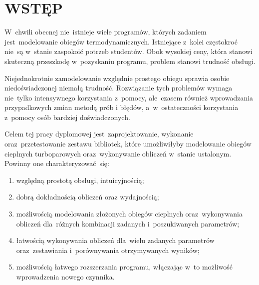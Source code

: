 \section{WSTĘP}

W~chwili obecnej nie~istnieje wiele programów, których zadaniem
jest~modelowanie obiegów termodynamicznych. Istniejące z~kolei
częstokroć nie~są w~stanie zaspokoić potrzeb studentów. Obok wysokiej
ceny, która stanowi skuteczną przeszkodę w~pozyskaniu programu,
problem stanowi trudność obsługi.

Niejednokrotnie zamodelowanie względnie prostego obiegu sprawia osobie
niedoświadczonej niemałą trudność. Rozwiązanie tych problemów wymaga
nie~tylko intensywnego korzystania z~pomocy, ale~czasem również
wprowadzania przypadkowych zmian metodą prób i błędów, a~w~ostateczności
korzystania z~pomocy osób bardziej doświadczonych.

Celem tej pracy dyplomowej jest~zaprojektowanie, wykonanie
oraz~przetestowanie zestawu bibliotek, które umożliwiłyby modelowanie
obiegów cieplnych turboparowych oraz~wykonywanie obliczeń w~stanie
ustalonym. Powinny one charakteryzować~się:

\begin{enumerate}

\item względną prostotą obsługi, intuicyjnością;

\item dobrą dokładnością obliczeń oraz wydajnością;

\item możliwością modelowania złożonych obiegów cieplnych
oraz~wykonywania obliczeń dla~różnych kombinacji zadanych
i~poszukiwanych parametrów;

\item łatwością wykonywania obliczeń dla~wielu zadanych parametrów
oraz~zestawiania i~porównywania otrzymywanych wyników;

\item możliwością łatwego rozszerzania programu, włączając w~to
możliwość wprowadzenia nowego czynnika.

\end{enumerate}
